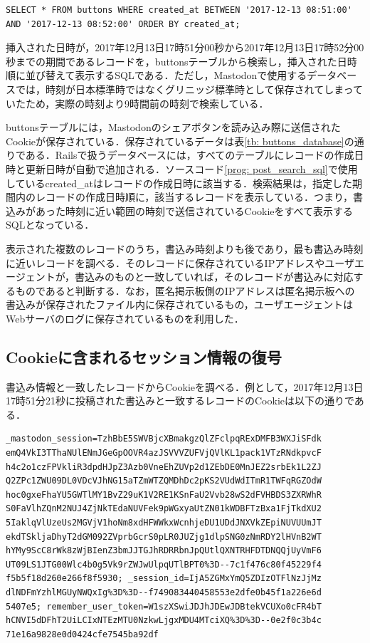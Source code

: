 \documentclass[10pt, a4paper]{jreport}
\begin{document}
\begin{lstlisting}[caption=2017年12月13日17時50分34秒にあった書込みに対応するCookieを検索するSQL,label=prog: post_search_sql]
SELECT * FROM buttons WHERE created_at BETWEEN '2017-12-13 08:51:00' AND '2017-12-13 08:52:00' ORDER BY created_at;
\end{lstlisting}

挿入された日時が，2017年12月13日17時51分00秒から2017年12月13日17時52分00秒までの期間であるレコードを，buttonsテーブルから検索し，挿入された日時順に並び替えて表示するSQLである．ただし，Mastodonで使用するデータベースでは，時刻が日本標準時ではなくグリニッジ標準時として保存されてしまっていたため，実際の時刻より9時間前の時刻で検索している．

buttonsテーブルには，Mastodonのシェアボタンを読み込み際に送信されたCookieが保存されている．保存されているデータは表\ref{tb: buttons_database}の通りである．Railsで扱うデータベースには，すべてのテーブルにレコードの作成日時と更新日時が自動で追加される．ソースコード\ref{prog: post_search_sql}で使用しているcreated\_atはレコードの作成日時に該当する．検索結果は，指定した期間内のレコードの作成日時順に，該当するレコードを表示している．つまり，書込みがあった時刻に近い範囲の時刻で送信されているCookieをすべて表示するSQLとなっている．

表示された複数のレコードのうち，書込み時刻よりも後であり，最も書込み時刻に近いレコードを調べる．そのレコードに保存されているIPアドレスやユーザエージェントが，書込みのものと一致していれば，そのレコードが書込みに対応するものであると判断する．なお，匿名掲示板側のIPアドレスは匿名掲示板への書込みが保存されたファイル内に保存されているもの，ユーザエージェントはWebサーバのログに保存されているものを利用した．

\subsection{Cookieに含まれるセッション情報の復号}
書込み情報と一致したレコードからCookieを調べる．例として，2017年12月13日17時51分21秒に投稿された書込みと一致するレコードのCookieは以下の通りである．

\begin{verbatim}
_mastodon_session=TzhBbE5SWVBjcXBmakgzQlZFclpqRExDMFB3WXJiSFdk
emQ4VkI3TThaNUlENmJGeGpOOVR4azJSVVVZUFVjQVlKL1pack1VTzRNdkpvcF
h4c2o1czFPVkliR3dpdHJpZ3Azb0VneEhZUVp2d1ZEbDE0MnJEZ2srbEk1L2ZJ
Q2ZPc1ZWU09DL0VDcVJhNG15aTZmWTZQMDhDc2pKS2VUdWdITmR1TWFqRGZOdW
hoc0gxeFhaYU5GWTlMY1BvZ29uK1V2RE1KSnFaU2Vvb28wS2dFVHBDS3ZXRWhR
S0FaVlhZQnM2NUJ4ZjNkTEdaNUVFek9pWGxyaUtZN01kWDBFTzBxa1FjTkdXU2
5IaklqVlUzeUs2MGVjV1hoNm8xdHFWWkxWcnhjeDU1UDdJNXVkZEpiNUVUUmJT
ekdTSkljaDhyT2dGM092ZVprbGcrS0pLR0JUZjg1dlpSNG0zNmRDY2lHVnB2WT
hYMy9ScC8rWk8zWjBIenZ3bmJJTGJhRDRRbnJpQUtlQXNTRHFDTDNQQjUyVmF6
UT09LS1JTG00Wlc4b0g5Vk9rZWJwUlpqUTlBPT0%3D--7c1f476c80f45229f4
f5b5f18d260e266f8f5930; _session_id=IjA5ZGMxYmQ5ZDIzOTFlNzJjMz
dlNDFmYzhlMGUyNWQxIg%3D%3D--f749083440458553e2dfe0b45f1a226e6d
5407e5; remember_user_token=W1szXSwiJDJhJDEwJDBtekVCUXo0cFR4bT
hCNVI5dDFhT2UiLCIxNTEzMTU0NzkwLjgxMDU4MTciXQ%3D%3D--0e2f0c3b4c
71e16a9828e0d0424cfe7545ba92df
\end{verbatim}
\end{document}

